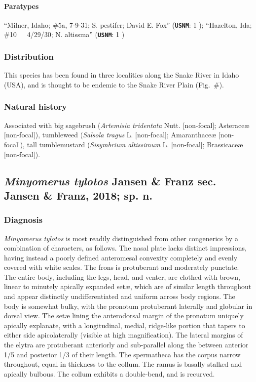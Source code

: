\documentclass[fleqn,10pt,lineno]{wlpeerj} %
\begin{document}
			\paragraph{Paratypes}
				``Milner, Idaho; \#5a, 7-9-31; S. pestifer; David E. Fox'' (\texttt{\textbf{USNM}}: 1 \female);
				``Hazelton, Ida; \#10~~~4/29/30; N. altissma'' (\texttt{\textbf{USNM}}: 1 \male)
		\subsubsection*{Distribution}
			This species has been found in three localities along the Snake River in Idaho (USA), and is thought to be endemic to the Snake River Plain (Fig.~\#).
		\subsubsection*{Natural history}
			Associated with big sagebrush (\textit{Artemisia tridentata} Nutt. [non-focal]; Asterace{\ae} [non-focal]), tumbleweed (\textit{Salsola tragus} L. [non-focal]; Amaranthace{\ae} [non-focal]), tall tumblemustard (\textit{Sisymbrium altissimum} L. [non-focal]; Brassicace{\ae} [non-focal]).

	\subsection*{\textit{Minyomerus tylotos} Jansen \& Franz sec. Jansen \& Franz, 2018; sp. n.}
		\subsubsection*{Diagnosis}
			\textit{Minyomerus tylotos} is most readily distinguished from other congenerics by a combination of characters, as follows.
			The nasal plate lacks distinct impressions, having instead a poorly defined anteromesal convexity completely and evenly covered with white scales.
			The frons is protuberant and moderately punctate.
			The entire body, including the legs, head, and venter, are clothed with brown, linear to minutely apically expanded set{\ae}, which are of similar length throughout and appear distinctly undifferentiated and uniform across body regions.
			The body is somewhat bulky, with the pronotum protuberant laterally and globular in dorsal view.
			The set{\ae} lining the anterodorsal margin of the pronotum uniquely apically explanate, with a longitudinal, medial, ridge-like portion that tapers to either side apicolaterally (visible at high magnification).
			The lateral margins of the elytra are protuberant anteriorly and sub-parallel along the between anterior 1/5 and posterior 1/3 of their length.
			The spermatheca has the corpus narrow throughout, equal in thickness to the collum.
			The ramus is basally stalked and apically bulbous.
			The collum exhibits a double-bend, and is recurved.
\end{document}
